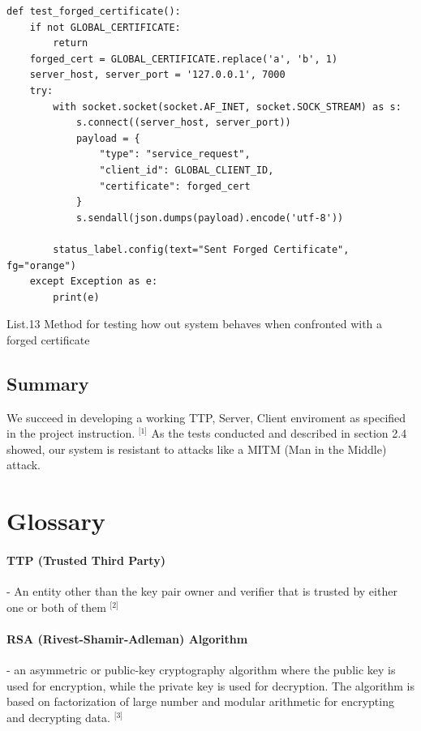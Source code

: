 \documentclass[12pt, a4paper]{report}
\begin{document}
\begin{verbatim}
def test_forged_certificate():
    if not GLOBAL_CERTIFICATE:
        return
    forged_cert = GLOBAL_CERTIFICATE.replace('a', 'b', 1)
    server_host, server_port = '127.0.0.1', 7000
    try:
        with socket.socket(socket.AF_INET, socket.SOCK_STREAM) as s:
            s.connect((server_host, server_port))
            payload = {
                "type": "service_request",
                "client_id": GLOBAL_CLIENT_ID,
                "certificate": forged_cert
            }
            s.sendall(json.dumps(payload).encode('utf-8'))

        status_label.config(text="Sent Forged Certificate", fg="orange")
    except Exception as e:
        print(e)
\end{verbatim}
\begin{center}
List.13 Method for testing how out system behaves when confronted with a forged certificate
\end{center}


\subsection{Summary}

We succeed in developing a working TTP, Server, Client enviroment as specified in the project instruction. \(^{\text{[1]}}\) As the tests conducted and described in section 2.4 showed, our system is resistant to attacks like a MITM (Man in the Middle) attack.

\newpage
\section{Glossary}
\paragraph{TTP (Trusted Third Party)} - An entity other than the key pair owner and verifier that is trusted by either one or both of them \(^{\text{[2]}}\)
\paragraph{RSA (Rivest-Shamir-Adleman) Algorithm} - an asymmetric or public-key cryptography algorithm where the public key is used for encryption, while the private key is used for decryption. The algorithm is based on factorization of large number and modular arithmetic for encrypting and decrypting data. \(^{\text{[3]}}\)
\end{document}
